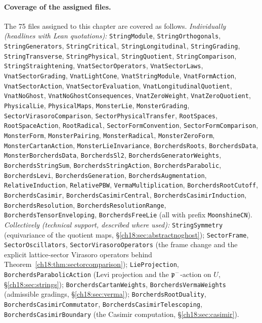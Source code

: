 \paragraph{Coverage of the assigned files.}  The 75 files assigned to this chapter are covered as follows.
\emph{Individually (headlines with Lean quotations):} \texttt{StringModule}, \texttt{StringOrthogonals}, \texttt{StringGenerators},
\texttt{StringCritical}, \texttt{StringLongitudinal}, \texttt{StringGrading}, \texttt{StringTransverse}, \texttt{StringPhysical},
\texttt{StringQuotient}, \texttt{StringComparison}, \texttt{StringStraightening}, \texttt{VnatSectorOperators}, \texttt{VnatSectorLaws},
\texttt{VnatSectorGrading}, \texttt{VnatLightCone}, \texttt{VnatStringModule}, \texttt{VnatFormAction}, \texttt{VnatSectorAction},
\texttt{VnatSectorEvaluation}, \texttt{VnatLongitudinalQuotient}, \texttt{VnatNoGhost}, \texttt{VnatNoGhostConsequences},
\texttt{VnatZeroWeight}, \texttt{VnatZeroQuotient}, \texttt{PhysicalLie}, \texttt{PhysicalMaps}, \texttt{MonsterLie}, \texttt{MonsterGrading},
\texttt{SectorVirasoroComparison}, \texttt{SectorPhysicalTransfer}, \texttt{RootSpaces}, \texttt{RootSpaceAction}, \texttt{RootRadical},
\texttt{SectorFormConvention}, \texttt{SectorFormComparison}, \texttt{MonsterForm}, \texttt{MonsterPairing}, \texttt{MonsterRadical},
\texttt{MonsterZeroForm}, \texttt{MonsterCartanAction}, \texttt{MonsterLieInvariance}, \texttt{BorcherdsRoots}, \texttt{BorcherdsData},
\texttt{MonsterBorcherdsData}, \texttt{BorcherdsSl2}, \texttt{BorcherdsGeneratorWeights}, \texttt{BorcherdsStringSum},
\texttt{BorcherdsStringAction}, \texttt{BorcherdsParabolic}, \texttt{BorcherdsLevi}, \texttt{BorcherdsGeneration},
\texttt{BorcherdsAugmentation}, \texttt{RelativeInduction}, \texttt{RelativePBW}, \texttt{VermaMultiplication}, \texttt{BorcherdsRootCutoff},
\texttt{BorcherdsCasimir}, \texttt{BorcherdsCasimirCentral}, \texttt{BorcherdsCasimirInduction}, \texttt{BorcherdsResolution},
\texttt{BorcherdsResolutionRange}, \texttt{BorcherdsTensorEnveloping}, \texttt{BorcherdsFreeLie} (all with prefix \texttt{MoonshineCN}).
\emph{Collectively (technical support, described where used):} \texttt{StringSymmetry} (equivariance of the quotient maps,
\S\ref{ch18:sec:abstractnoghost}); \texttt{SectorFrame}, \texttt{SectorOscillators}, \texttt{SectorVirasoroOperators} (the frame change and the
explicit lattice-sector Virasoro operators behind Theorem~\ref{ch18:thm:sectorcomparison}); \texttt{LieProjection},
\texttt{BorcherdsParabolicAction} (Levi projection and the $\mathfrak{p}^-$-action on $U$, \S\ref{ch18:sec:strings});
\texttt{BorcherdsCartanWeights}, \texttt{BorcherdsVermaWeights} (admissible gradings, \S\ref{ch18:sec:verma}); \texttt{BorcherdsRootDuality},
\texttt{BorcherdsCasimirCommutator}, \texttt{BorcherdsCasimirTelescoping}, \texttt{BorcherdsCasimirBoundary} (the Casimir computation,
\S\ref{ch18:sec:casimir}).

